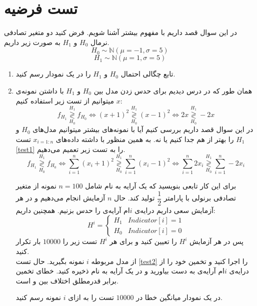 \documentclass[a4paper]{article}
\newcommand{\LRT}[2]{%
	\mathrel{\mathop\gtrless\limits^{#1}_{#2}}%
}
\begin{document}
\section{تست فرضیه}
در این سوال قصد داریم با مفهوم 
بیشتر آشنا شویم. فرض کنید دو متغیر تصادفی نرمال
 $ H_{0} $ 
 و
 $ {H}_{1} $ 
 به صورت زیر داریم. 
\begin{equation}
 	H_{0} \sim \mathbb{N} (\mu = -1, \sigma = 5)
\end{equation}
\begin{equation}
 	{H}_{1} \sim \mathbb{N} (\mu = 1, \sigma = 5)
\end{equation}
\begin{enumerate}
	\item 
	تابع چگالی احتمال 
	 $ {H}_{0} $ 
	و
	$ {H}_{1} $ 
	را در یک نمودار رسم کنید. 
	\item 
	همان‌ طور که در درس دیدیم برای حدس زدن مدل بین 
	 $ {H}_{0} $ 
و
	$ {H}_{1} $ 
	با داشتن نمونه‌ی 
$ x $	
	میتوانیم از تست زیر استفاده کنیم:
	\begin{equation}
		f_{{H}_{1}} \LRT{H_1}{H_0} f_{{H}_{0}} \Leftrightarrow (x+1)^{2} \LRT{H_1}{H_0} (x-1)^{2} \Leftrightarrow 2x \LRT{H_1}{H_0} -2x
	\label{test1}	
	\end{equation} 
در این سوال قصد داریم بررسی کنیم آیا با نمونه‌‌های بیشتر میتوانیم مدل‌های 
$ {H}_{0} $ 
و
$ {H}_{1} $ 
را بهتر از هم جدا کنیم یا نه. به همین منظور با داشته داده‌های 
$ x_{i=1:n} $
تست 
\ref{test1}
را به تست زیر تعمیم می‌دهیم.
	\begin{equation}
	f_{{H}_{1}} \LRT{H_1}{H_0} f_{{H}_{0}} \Leftrightarrow \sum_{i=1}^{n}(x_{i}+1)^{2} \LRT{H_1}{H_0} \sum_{i=1}^{n}(x_{i}-1)^{2} \Leftrightarrow \sum_{i=1}^{n} 2 x_{i}  \LRT{H_1}{H_0} \sum_{i=1}^{n} -2 x_{i} 
	\label{test2}	
	\end{equation}

برای این کار تابعی بنویسید که یک آرایه به نام 
شامل
 $ n = 100 $
  نمونه از متغیر تصادفی برنولی با پارامتر 
$ \dfrac{1}{2} $
تولید کند. حال $ n $ آزمایش انجام می‌دهیم و در هر آزمایش سعی داریم 
درایه‌ی $ i $ام آرایه‌ی 
را حدس بزنیم. همچنین داریم:
\begin{equation}
	H^{i} = \begin{cases}
		H_{1} & Indicator[i] = 1
		\\
		H_{0} & Indicator[i] = 0
	\end{cases}
\end{equation}
پس در هر آزمایش 
$ H^{i} $
را تعیین کنید و برای هر 
$ H^{i} $
تست زیر را $ 10000 $ بار تکرار کنید.
\\
 از مدل مربوطه $ i $ نمونه‌ ‌بگیرید. حال تست 
\ref{test2}
را اجرا کنید و تخمین خود را از درایه‌ی $ i $ام آرایه‌ی  
به دست بیاورید و در یک آرایه به نام 
ذخیره کنید. 
خطای تخمین برابر قدرمطلق اختلاف بین 
و
است. 

 در یک نمودار میانگین خطا در $ 10000 $ تست را به ازای $ i $ نمونه رسم کنید. 	
\end{enumerate}
\end{document}
